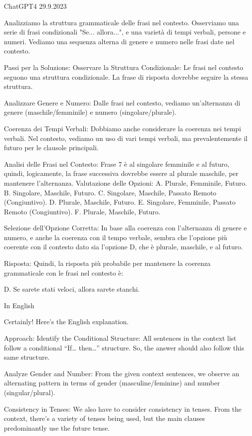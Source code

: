 ChatGPT4 29.9.2023

Analizziamo la struttura grammaticale delle frasi nel contesto. Osserviamo una serie di frasi condizionali "Se... allora...", e una varietà di tempi verbali, persone e numeri. Vediamo una sequenza alterna di genere e numero nelle frasi date nel contesto.

Passi per la Soluzione:
Osservare la Struttura Condizionale: Le frasi nel contesto seguono una struttura condizionale. La frase di risposta dovrebbe seguire la stessa struttura.

Analizzare Genere e Numero: Dalle frasi nel contesto, vediamo un'alternanza di genere (maschile/femminile) e numero (singolare/plurale).

Coerenza dei Tempi Verbali: Dobbiamo anche considerare la coerenza nei tempi verbali. Nel contesto, vediamo un uso di vari tempi verbali, ma prevalentemente il futuro per le clausole principali.

Analisi delle Frasi nel Contesto:
Frase 7 è al singolare femminile e al futuro, quindi, logicamente, la frase successiva dovrebbe essere al plurale maschile, per mantenere l'alternanza.
Valutazione delle Opzioni:
A. Plurale, Femminile, Futuro.
B. Singolare, Maschile, Futuro.
C. Singolare, Maschile, Passato Remoto (Congiuntivo).
D. Plurale, Maschile, Futuro.
E. Singolare, Femminile, Passato Remoto (Congiuntivo).
F. Plurale, Maschile, Futuro.

Selezione dell'Opzione Corretta:
In base alla coerenza con l'alternanza di genere e numero, e anche la coerenza con il tempo verbale, sembra che l'opzione più coerente con il contesto dato sia l'opzione D, che è plurale, maschile, e al futuro.

Risposta:
Quindi, la risposta più probabile per mantenere la coerenza grammaticale con le frasi nel contesto è:

D. Se sarete stati veloci, allora sarete stanchi.

In English

Certainly! Here's the English explanation.

Approach:
Identify the Conditional Structure: All sentences in the context list follow a conditional “If… then…” structure. So, the answer should also follow this same structure.

Analyze Gender and Number: From the given context sentences, we observe an alternating pattern in terms of gender (masculine/feminine) and number (singular/plural).

Consistency in Tenses: We also have to consider consistency in tenses. From the context, there’s a variety of tenses being used, but the main clauses predominantly use the future tense.

